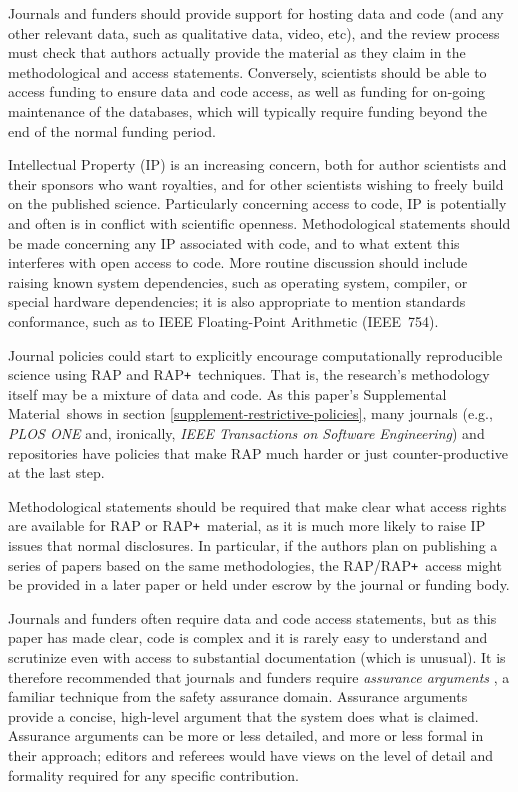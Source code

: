\documentclass{comjnl}
\def\supplement{Supplemental Material}
\def\RAPstar{RAP{\tt +}}
\begin{document}
Journals and funders should provide support for hosting data and code (and any other relevant data, such as qualitative data, video, etc), and the review process must check that authors actually provide the material as they claim in the methodological and access statements. Conversely, scientists should be able to access funding to ensure data and code access, as well as funding for on-going maintenance of the databases, which will typically require funding beyond the end of the normal funding period.

Intellectual Property (IP) is an increasing concern, both for author scientists and their sponsors who want royalties, and for other scientists wishing to freely build on the published science. Particularly concerning access to code, IP is potentially and often is in conflict with scientific openness. Methodological statements should be made concerning any IP associated with code, and to what extent this interferes with open access to code. More routine discussion should include raising known system dependencies, such as operating system, compiler, or special hardware dependencies; it is also appropriate to mention standards conformance, such as to IEEE Floating-Point Arithmetic (IEEE~754).

\label{mentionPLOSandIEEE}
Journal policies could start to explicitly encourage computationally reproducible science using RAP and \RAPstar\ techniques. That is, the research's methodology itself may be a mixture of data and code. As this paper's \supplement\ shows in section \ref{supplement-restrictive-policies}, many journals (e.g., \emph{PLOS ONE\/} and, ironically, \emph{IEEE Transactions on Software Engineering\/}) and repositories have policies that make RAP much harder or just counter-productive at the last step. 

Methodological statements should be required that make clear what access rights are available for RAP or \RAPstar\ material, as it is much more likely to raise IP issues that normal disclosures. In particular, if the authors plan on publishing a series of papers based on the same methodologies, the RAP/\RAPstar\ access might be provided in a later paper or held under escrow by the journal or funding body.

Journals and funders often require data and code access statements, but as this paper has made clear, code is complex and it is rarely easy to understand and scrutinize even with access to substantial documentation (which is unusual). It is therefore recommended that journals and funders require \emph{assurance arguments} \cite{assurance-case}, a familiar technique from the safety assurance domain. Assurance arguments provide a concise, high-level argument that the system does what is claimed. Assurance arguments can be more or less detailed, and more or less formal in their approach; editors and referees would have views on the level of detail and formality required for any specific contribution.
\end{document}
